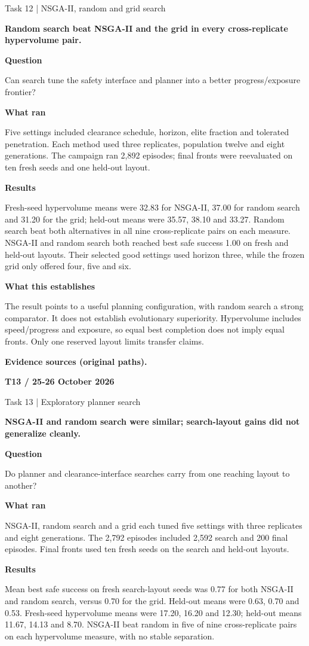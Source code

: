 \documentclass[11pt,a4paper]{article}
\newcommand{\block}[2]{\par\textbf{\color{ink}#1}\par\nopagebreak #2\par}
\newcommand{\finding}[1]{\begin{tcolorbox}[colback=pale,colframe=pale,boxrule=0pt,arc=1mm,left=10pt,right=10pt,top=10pt,bottom=10pt]\color{ink}\large\bfseries #1\end{tcolorbox}}
\begin{document}
{\color{muted}\small Task 12 | NSGA-II, random and grid search}\par\vspace{2mm}
\finding{Random search beat NSGA-II and the grid in every cross-replicate hypervolume pair.}
\block{Question}{Can search tune the safety interface and planner into a better progress/exposure frontier?}
\block{What ran}{Five settings included clearance schedule, horizon, elite fraction and tolerated penetration. Each method used three replicates, population twelve and eight generations. The campaign ran 2,892 episodes; final fronts were reevaluated on ten fresh seeds and one held-out layout.}
\block{Results}{Fresh-seed hypervolume means were 32.83 for NSGA-II, 37.00 for random search and 31.20 for the grid; held-out means were 35.57, 38.10 and 33.27. Random search beat both alternatives in all nine cross-replicate pairs on each measure. NSGA-II and random search both reached best safe success 1.00 on fresh and held-out layouts. Their selected good settings used horizon three, while the frozen grid only offered four, five and six.}
\block{What this establishes}{The result points to a useful planning configuration, with random search a strong comparator. It does not establish evolutionary superiority. Hypervolume includes speed/progress and exposure, so equal best completion does not imply equal fronts. Only one reserved layout limits transfer claims.}
\vfill{\footnotesize\color{muted}\textbf{Evidence sources (original paths).}\par
\raggedright {}}
\clearpage
{}\label{exp:T13}
{\color{accent}\small\bfseries T13 / 25-26 October 2026}\par
{}\par
{\color{muted}\small Task 13 | Exploratory planner search}\par\vspace{2mm}
\finding{NSGA-II and random search were similar; search-layout gains did not generalize cleanly.}
\block{Question}{Do planner and clearance-interface searches carry from one reaching layout to another?}
\block{What ran}{NSGA-II, random search and a grid each tuned five settings with three replicates and eight generations. The 2,792 episodes included 2,592 search and 200 final episodes. Final fronts used ten fresh seeds on the search and held-out layouts.}
\block{Results}{Mean best safe success on fresh search-layout seeds was 0.77 for both NSGA-II and random search, versus 0.70 for the grid. Held-out means were 0.63, 0.70 and 0.53. Fresh-seed hypervolume means were 17.20, 16.20 and 12.30; held-out means 11.67, 14.13 and 8.70. NSGA-II beat random in five of nine cross-replicate pairs on each hypervolume measure, with no stable separation.}
\end{document}
